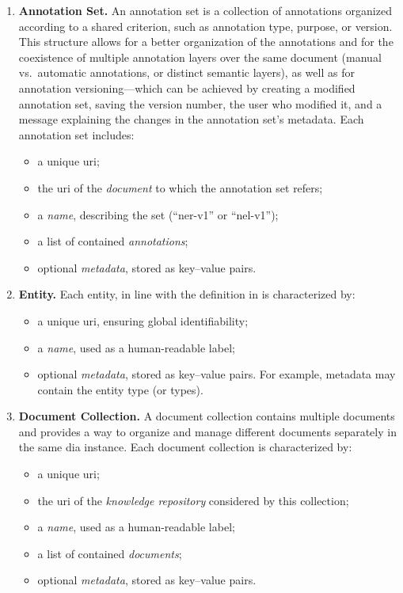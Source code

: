 \begin{enumerate}[label=\textbf{\arabic*.}, leftmargin=2em]
  \item \textbf{Annotation Set.}  
  An annotation set is a collection of annotations organized according to a shared criterion, such as annotation type, purpose, or version. This structure allows for a better organization of the annotations and for the coexistence of multiple annotation layers over the same document (\eg manual vs.\ automatic annotations, or distinct semantic layers), as well as for annotation versioning---which can be achieved by creating a modified annotation set, saving the version number, the user who modified it, and a message explaining the changes in the annotation set's metadata.  
  Each annotation set includes:
  \begin{itemize}
    \item a unique \ac{uri};
    \item the \ac{uri} of the \emph{document} to which the annotation set refers;
    \item a \emph{name}, describing the set (\eg ``\ac{ner}-v1'' or ``\ac{nel}-v1'');
    \item a list of contained \emph{annotations};
    \item optional \emph{metadata}, stored as key--value pairs.
  \end{itemize}
  \item \textbf{Entity.}  
    Each entity, in line with the definition in  is characterized by:
    \begin{itemize}
        \item a unique \ac{uri}, ensuring global identifiability;
        \item a \emph{name}, used as a human-readable label;
        \item optional \emph{metadata}, stored as key--value pairs. For example, metadata may contain the entity type (or types).
    \end{itemize}

  \item \textbf{Document Collection.}
  A document collection contains multiple documents and provides a way to organize and manage different documents separately in the same \ac{dia} instance.
  Each document collection is characterized by:
  \begin{itemize}
    \item a unique \ac{uri};
    \item the \ac{uri} of the \emph{knowledge repository} considered by this collection;
    \item a \emph{name}, used as a human-readable label;
    \item a list of contained \emph{documents};
    \item optional \emph{metadata}, stored as key--value pairs.
  \end{itemize}


\end{enumerate}
